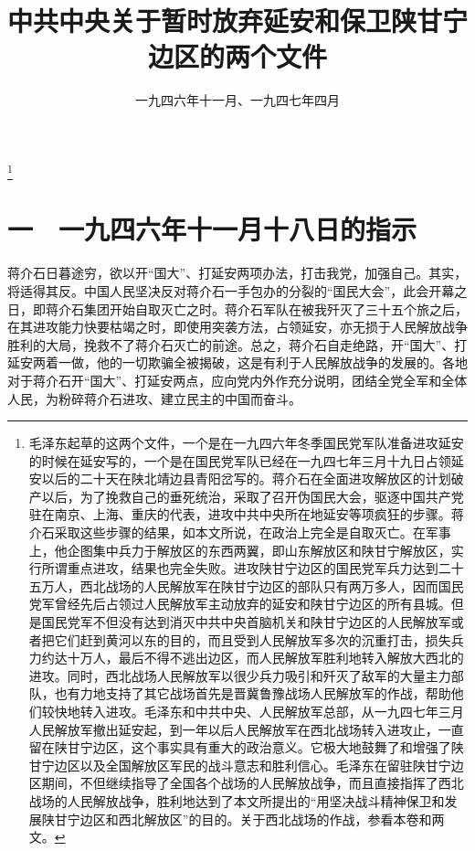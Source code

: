 
\title{中共中央关于暂时放弃延安和保卫陕甘宁边区的两个文件}
\date{一九四六年十一月、一九四七年四月}
\thanks{毛泽东起草的这两个文件，一个是在一九四六年冬季国民党军队准备进攻延安的时候在延安写的，一个是在国民党军队已经在一九四七年三月十九日占领延安以后的二十天在陕北靖边县青阳岔写的。蒋介石在全面进攻解放区的计划破产以后，为了挽救自己的垂死统治，采取了召开伪国民大会，驱逐中国共产党驻在南京、上海、重庆的代表，进攻中共中央所在地延安等项疯狂的步骤。蒋介石采取这些步骤的结果，如本文所说，在政治上完全是自取灭亡。在军事上，他企图集中兵力于解放区的东西两翼，即山东解放区和陕甘宁解放区，实行所谓重点进攻，结果也完全失败。进攻陕甘宁边区的国民党军兵力达到二十五万人，西北战场的人民解放军在陕甘宁边区的部队只有两万多人，因而国民党军曾经先后占领过人民解放军主动放弃的延安和陕甘宁边区的所有县城。但是国民党军不但没有达到消灭中共中央首脑机关和陕甘宁边区的人民解放军或者把它们赶到黄河以东的目的，而且受到人民解放军多次的沉重打击，损失兵力约达十万人，最后不得不逃出边区，而人民解放军胜利地转入解放大西北的进攻。同时，西北战场人民解放军以很少兵力吸引和歼灭了敌军的大量主力部队，也有力地支持了其它战场首先是晋冀鲁豫战场人民解放军的作战，帮助他们较快地转入进攻。毛泽东和中共中央、人民解放军总部，从一九四七年三月人民解放军撤出延安起，到一年以后人民解放军在西北战场转入进攻止，一直留在陕甘宁边区，这个事实具有重大的政治意义。它极大地鼓舞了和增强了陕甘宁边区以及全国解放区军民的战斗意志和胜利信心。毛泽东在留驻陕甘宁边区期间，不但继续指导了全国各个战场的人民解放战争，而且直接指挥了西北战场的人民解放战争，胜利地达到了本文所提出的“用坚决战斗精神保卫和发展陕甘宁边区和西北解放区”的目的。关于西北战场的作战，参看本卷和两文。}
\maketitle


\section{一　一九四六年十一月十八日的指示}

蒋介石日暮途穷，欲以开“国大”、打延安两项办法，打击我党，加强自己。其实，将适得其反。中国人民坚决反对蒋介石一手包办的分裂的“国民大会”，此会开幕之日，即蒋介石集团开始自取灭亡之时。蒋介石军队在被我歼灭了三十五个旅之后，在其进攻能力快要枯竭之时，即使用突袭方法，占领延安，亦无损于人民解放战争胜利的大局，挽救不了蒋介石灭亡的前途。总之，蒋介石自走绝路，开“国大”、打延安两着一做，他的一切欺骗全被揭破，这是有利于人民解放战争的发展的。各地对于蒋介石开“国大”、打延安两点，应向党内外作充分说明，团结全党全军和全体人民，为粉碎蒋介石进攻、建立民主的中国而奋斗。

